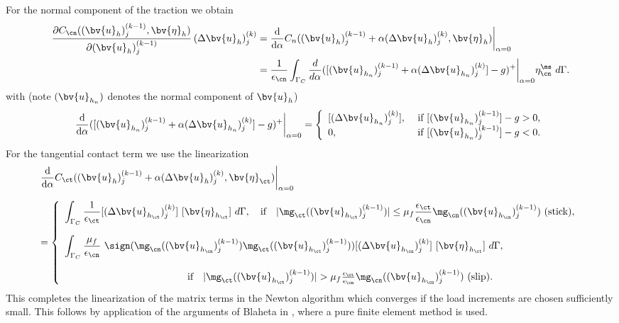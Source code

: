 For the normal component of the traction we obtain
\begin{align*}
\frac{\partial
  C_{\cn}((\bv{u}_h)_j^{(k-1)},\bv{\eta} _h)}{\partial
  (\bv{u}_h)_j^{(k-1)}} \, (\Delta\bv{u}_h)_j^{(k)} &= \dfrac{\mathrm{d}}{\mathrm{d} \alpha} C_{n} ((\bv{u}_h)^{(k-1)}_j + \alpha (\Delta \bv{u}_h)_j^{(k)} ,\bv{\eta} _h)\bigg|_{\alpha=0}
 \\
& = \frac{1}{\epsilon_{\cn}} \int_{\Gamma_C} \dfrac{d}{d \alpha} ([(\bv{u}_{h_n})^{(k-1)}_j + \alpha (\Delta \bv{u}_{h_n})_j^{(k)}] -
g)^+ \bigg|_{\alpha=0}
 \eta^{\sl\ms}_{\cn} \,\,d\Gamma.
\end{align*}
with (note $(\bv{u}_{h_n})$ denotes the normal component of $\bv{u}_h$)
\begin{equation*}
\dfrac{\mathrm{d}}{\mathrm{d} \alpha} ([(\bv{u}_{h_n})^{(k-1)}_j + \alpha (\Delta
\bv{u}_{h_n})_j^{(k)}] - g)^+ \bigg|_{\alpha=0} 
= \left\lbrace 
\begin{array}{ll}
[(\Delta \bv{u}_{h_n})^{(k)}_j], & \mbox{ if } [(\bv{u}_{h_n})_j^{(k-1)}] - g > 0, \\
0, & \mbox{ if } [(\bv{u}_{h_n})_j^{(k-1)}] - g < 0.
\end{array} \right.
\end{equation*}
For the tangential contact term we use the linearization
\begin{equation*}
\begin{array}{l}
\dfrac{\mathrm{d}}{\mathrm{d} \alpha} C_{\ct} ((\bv{u}_h)^{(k-1)}_j + \alpha (\Delta \bv{u}_h)_j^{(k)}
,\bv{\eta}_{\ct})\bigg|_{\alpha=0}\\[4ex] 
= \left\lbrace 
\begin{array} {l} \displaystyle
 \int_{\Gamma_C} \frac{1}{\epsilon_{\ct}} [(\Delta \bv{u}_{h_{\ct}})_j^{(k)}]\,\, [\bv{\eta} _{h_{\ct}}] \,\,d\Gamma,
\quad \mbox{if} \quad | \mg_{\ct}((\bv{u}_{h_{\ct}})^{(k-1)}_j)| \leq \mu_f
\frac{\epsilon_{\ct}}{\epsilon_{\cn}} \mg_{\cn}((\bv{u}_{h_{\cn}})^{(k-1)}_j) \mbox{ (stick)}, \\[4ex]
\displaystyle
\int_{\Gamma_C} \dfrac{\mu_f}{\epsilon_{\cn}} \,\,\sign(\mg_{\cn}((\bv{u}_{h_{\cn}})^{(k-1)}_j)
\mg_{\ct}((\bv{u}_{h_{\ct}})^{(k-1)}_j)) [(\Delta \bv{u}_{h_{\cn}})_j^{(k)}] \,\, [\bv{\eta} _{h_{\ct}}]
\,\,d\Gamma,  \\[4ex]
\hspace{4cm}
\quad \mbox{if} \quad | \mg_{\ct}((\bv{u}_{h_{\ct}})^{(k-1)}_j)| > \mu_f
\frac{\epsilon_{\ct}}{\epsilon_{\cn}} \mg_{\cn}((\bv{u}_{h_{\cn}})^{(k-1)}_j)  \mbox{ (slip)}.
\end{array}\right.
\end{array}
\end{equation*}
This completes the linearization of the matrix terms in the Newton algorithm
which converges if the load increments are chosen sufficiently small. This
follows by application of the arguments of Blaheta in \cite{Bl97},
where a pure finite element method is used. 



